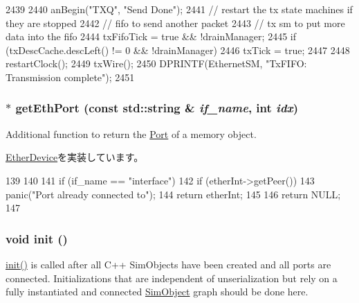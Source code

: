 \begin{DoxyCode}
2439 {
2440     anBegin("TXQ", "Send Done");
2441     // restart the tx state machines if they are stopped
2442     // fifo to send another packet
2443     // tx sm to put more data into the fifo
2444     txFifoTick = true && !drainManager;
2445     if (txDescCache.descLeft() != 0 && !drainManager)
2446         txTick = true;
2447 
2448     restartClock();
2449     txWire();
2450     DPRINTF(EthernetSM, "TxFIFO: Transmission complete\n");
2451 }
\end{DoxyCode}
\hypertarget{classIGbE_a10260c5a583c0894dcdcd1ced50a53ae}{
\subsubsection[{getEthPort}]{ $\ast$ getEthPort (const std::string \& {\em if\_\-name}, \/  int {\em idx})}}
\label{classIGbE_a10260c5a583c0894dcdcd1ced50a53ae}
Additional function to return the \hyperlink{classPort}{Port} of a memory object. 

\hyperlink{classEtherDevice_ac1aa24c1f8c0f1ee8bdc3f3d3799f67c}{EtherDevice}を実装しています。


\begin{DoxyCode}
139 {
140 
141     if (if_name == "interface") {
142         if (etherInt->getPeer())
143             panic("Port already connected to\n");
144         return etherInt;
145     }
146     return NULL;
147 }
\end{DoxyCode}
\hypertarget{classIGbE_a02fd73d861ef2e4aabb38c0c9ff82947}{
\subsubsection[{init}]{\setlength{\rightskip}{0pt plus 5cm}void init ()}}
\label{classIGbE_a02fd73d861ef2e4aabb38c0c9ff82947}
\hyperlink{classIGbE_a02fd73d861ef2e4aabb38c0c9ff82947}{init()} is called after all C++ SimObjects have been created and all ports are connected. Initializations that are independent of unserialization but rely on a fully instantiated and connected \hyperlink{classSimObject}{SimObject} graph should be done here. 

